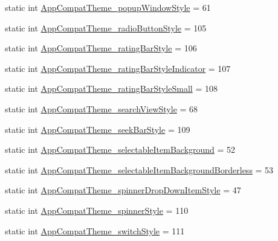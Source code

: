 \begin{DoxyCompactItemize}
\item 
static int \hyperlink{classandroid_1_1support_1_1v7_1_1appcompat_1_1R_1_1styleable_ab49e956338c41cad14a71489cf3e3ad1}{App\+Compat\+Theme\+\_\+popup\+Window\+Style} = 61
\item 
static int \hyperlink{classandroid_1_1support_1_1v7_1_1appcompat_1_1R_1_1styleable_a32deb732b0bc3a329b727aef8b0c20d7}{App\+Compat\+Theme\+\_\+radio\+Button\+Style} = 105
\item 
static int \hyperlink{classandroid_1_1support_1_1v7_1_1appcompat_1_1R_1_1styleable_a3252c016d788ccf2df296402f41db160}{App\+Compat\+Theme\+\_\+rating\+Bar\+Style} = 106
\item 
static int \hyperlink{classandroid_1_1support_1_1v7_1_1appcompat_1_1R_1_1styleable_a41bbe74341c8a14fa0aee8d6ae300f08}{App\+Compat\+Theme\+\_\+rating\+Bar\+Style\+Indicator} = 107
\item 
static int \hyperlink{classandroid_1_1support_1_1v7_1_1appcompat_1_1R_1_1styleable_a3d5d0c2c3772e2f0c3548e65cffca34f}{App\+Compat\+Theme\+\_\+rating\+Bar\+Style\+Small} = 108
\item 
static int \hyperlink{classandroid_1_1support_1_1v7_1_1appcompat_1_1R_1_1styleable_a0dd40ca8d5fe4531e45a7f4d0c4cc276}{App\+Compat\+Theme\+\_\+search\+View\+Style} = 68
\item 
static int \hyperlink{classandroid_1_1support_1_1v7_1_1appcompat_1_1R_1_1styleable_a082b50a47359f28a983cbc03e6d51289}{App\+Compat\+Theme\+\_\+seek\+Bar\+Style} = 109
\item 
static int \hyperlink{classandroid_1_1support_1_1v7_1_1appcompat_1_1R_1_1styleable_ad19a8df967ad91c672478f779be959c7}{App\+Compat\+Theme\+\_\+selectable\+Item\+Background} = 52
\item 
static int \hyperlink{classandroid_1_1support_1_1v7_1_1appcompat_1_1R_1_1styleable_a6b4e748fcf3ab58f9a756773bb3bf432}{App\+Compat\+Theme\+\_\+selectable\+Item\+Background\+Borderless} = 53
\item 
static int \hyperlink{classandroid_1_1support_1_1v7_1_1appcompat_1_1R_1_1styleable_abcc5a46cb6b46deb459f96b4b614a633}{App\+Compat\+Theme\+\_\+spinner\+Drop\+Down\+Item\+Style} = 47
\item 
static int \hyperlink{classandroid_1_1support_1_1v7_1_1appcompat_1_1R_1_1styleable_a479f2661585bab71f0ceb0c86482f40d}{App\+Compat\+Theme\+\_\+spinner\+Style} = 110
\item 
static int \hyperlink{classandroid_1_1support_1_1v7_1_1appcompat_1_1R_1_1styleable_a57e1f510b55a34ce46089f5c131a9d99}{App\+Compat\+Theme\+\_\+switch\+Style} = 111

\end{DoxyCompactItemize}
